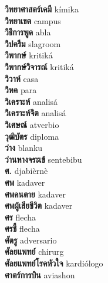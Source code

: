 \textbf{ วิทยาศาสตร์เคมี  } kímika \\
\textbf{ วิทยาเขต  } campus \\
\textbf{ วิธีการพูด  } abla \\
\textbf{ วิปครีม  } slagroom \\
\textbf{ วิพากษ์  } kritiká \\
\textbf{ วิพากษ์วิจารณ์  } kritiká \\
\textbf{ วิวาห์  } casa \\
\textbf{ วิหค  } para \\
\textbf{ วิเคราะห์  } analisá \\
\textbf{ วิเคราะห์จิต  } analisá \\
\textbf{ วิเศษณ์  } atverbio \\
\textbf{ วุฒิบัตร  } diploma \\
\textbf{ ว่าง  } blanku \\
\textbf{ ว่านหางจระเข้  } sentebibu \\
\textbf{ ศ.  } djabièrnè \\
\textbf{ ศพ  } kadaver \\
\textbf{ ศพคนตาย  } kadaver \\
\textbf{ ศพผู้เสียชีวิต  } kadaver \\
\textbf{ ศร  } flecha \\
\textbf{ ศรชี้  } flecha \\
\textbf{ ศัตรู  } adversario \\
\textbf{ ศัลยแพทย์  } chirurg \\
\textbf{ ศัลยแพทย์โรคหัวใจ  } kardiólogo \\
\textbf{ ศาตร์การบิน  } aviashon \\
